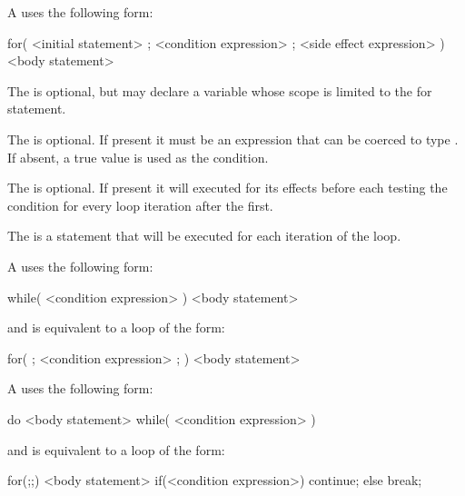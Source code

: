 

A  uses the following form:

\begin{codeblock}
for( <initial statement> ; <condition expression> ; <side effect expression> ) <body statement>
\end{codeblock}

The  is optional, but may declare a variable whose scope is limited to the for statement.

The  is optional. If present it must be an expression that can be coerced to type . If absent, a true value is used as the condition.

The  is optional. If present it will executed for its effects before each testing the condition for every loop iteration after the first.

The  is a statement that will be executed for each iteration of the loop.


A  uses the following form:

\begin{codeblock}
while( <condition expression> ) <body statement>
\end{codeblock}

and is equivalent to a  loop of the form:

\begin{codeblock}
for( ; <condition expression> ; ) <body statement>
\end{codeblock}


A  uses the following form:

\begin{codeblock}
do <body statement> while( <condition expression> )
\end{codeblock}

and is equivalent to a  loop of the form:

\begin{codeblock}
for(;;)
{
	<body statement>
	if(<condition expression>) continue; else break;
}
\end{codeblock}

